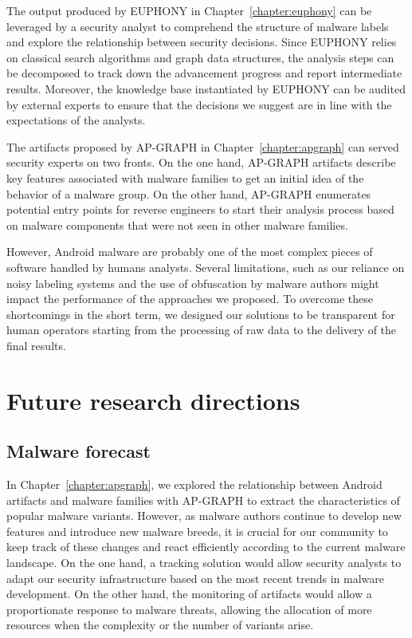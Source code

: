The output produced by EUPHONY in Chapter~\ref{chapter:euphony} can be leveraged by a security analyst to comprehend the structure of malware labels and explore the relationship between security decisions.
Since EUPHONY relies on classical search algorithms and graph data structures, the analysis steps can be decomposed to track down the advancement progress and report intermediate results.
Moreover, the knowledge base instantiated by EUPHONY can be audited by external experts to ensure that the decisions we suggest are in line with the expectations of the analysts.

The artifacts proposed by AP-GRAPH in Chapter~\ref{chapter:apgraph} can served security experts on two fronts.
On the one hand, AP-GRAPH artifacts describe key features associated with malware families to get an initial idea of the behavior of a malware group.
On the other hand, AP-GRAPH enumerates potential entry points for reverse engineers to start their analysis process based on malware components that were not seen in other malware families.

However, Android malware are probably one of the most complex pieces of software handled by humans analysts.
Several limitations, such as our reliance on noisy labeling systems and the use of obfuscation by malware authors might impact the performance of the approaches we proposed.
To overcome these shortcomings in the short term, we designed our solutions to be transparent for human operators starting from the processing of raw data to the delivery of the final results.
\section{Future research directions}
\subsection{Malware forecast}
In Chapter~\ref{chapter:apgraph}, we explored the relationship between Android artifacts and malware families with AP-GRAPH to extract the characteristics of popular malware variants.
However, as malware authors continue to develop new features and introduce new malware breeds, it is crucial for our community to keep track of these changes and react efficiently according to the current malware landscape.
On the one hand, a tracking solution would allow security analysts to adapt our security infrastructure based on the most recent trends in malware development.
On the other hand, the monitoring of artifacts would allow a proportionate response to malware threats, allowing the allocation of more resources when the complexity or the number of variants arise.

